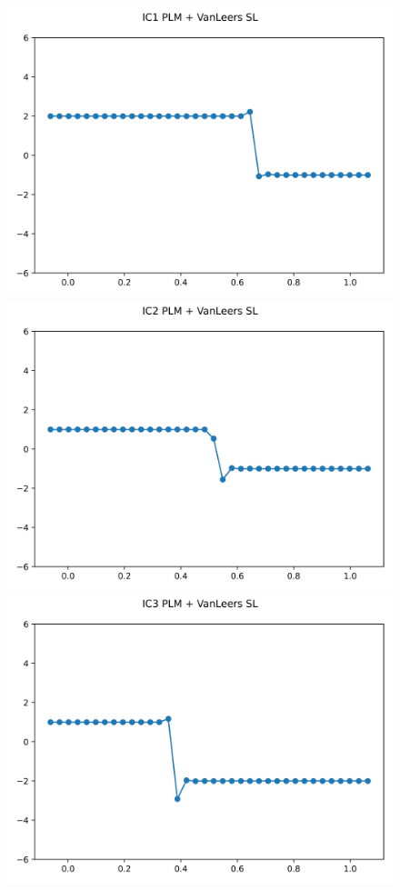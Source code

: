 \documentclass{article}
\begin{document}
\begin{figure}[t]
    \emp
        \centering
        \includegraphics[width=.95\textwidth]{../../code/unsafe_IC1Methodpv_plot.png}
        \includegraphics[width=.95\textwidth]{../../code/unsafe_IC2Methodpv_plot.png}
        \includegraphics[width=.95\textwidth]{../../code/unsafe_IC3Methodpv_plot.png}

\end{figure}
\end{document}
